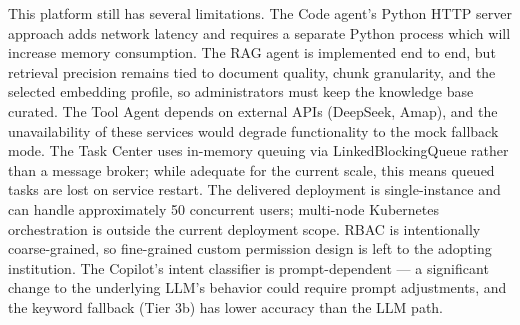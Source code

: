 This platform still has several limitations. The Code agent's Python HTTP server approach adds network latency and requires a separate Python process which will increase memory consumption. The RAG agent is implemented end to end, but retrieval precision remains tied to document quality, chunk granularity, and the selected embedding profile, so administrators must keep the knowledge base curated. The Tool Agent depends on external APIs (DeepSeek, Amap), and the unavailability of these services would degrade functionality to the mock fallback mode. The Task Center uses in-memory queuing via LinkedBlockingQueue rather than a message broker; while adequate for the current scale, this means queued tasks are lost on service restart. The delivered deployment is single-instance and can handle approximately 50 concurrent users; multi-node Kubernetes orchestration is outside the current deployment scope. RBAC is intentionally coarse-grained, so fine-grained custom permission design is left to the adopting institution. The Copilot's intent classifier is prompt-dependent --- a significant change to the underlying LLM's behavior could require prompt adjustments, and the keyword fallback (Tier 3b) has lower accuracy than the LLM path.

\newpage

